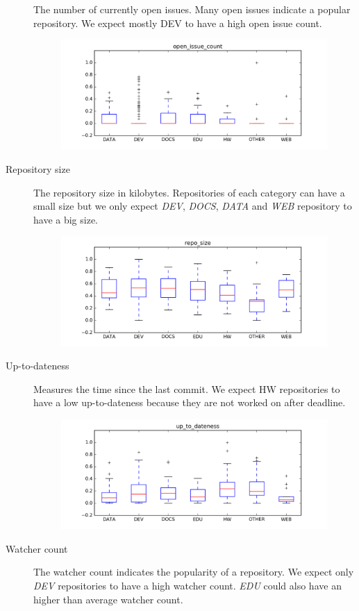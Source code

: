 \documentclass[a4paper]{scrartcl}
\begin{document}
\begin{description}
				The number of currently open issues. Many open issues indicate a popular repository. We expect mostly DEV to have a high open issue count.
				\begin{figure}[h!]
					\centering
					\includegraphics[width=0.75\linewidth]{figures/open_issue_count.png}
				\end{figure}
			\item[Repository size]
				The repository size in kilobytes. Repositories of each category can have a small size but we only expect \emph{DEV}, \emph{DOCS}, \emph{DATA} and \emph{WEB} repository to have a big size.
				\begin{figure}[h!]
					\centering
					\includegraphics[width=0.75\linewidth]{figures/repo_size.png}
				\end{figure}
			\item[Up-to-dateness]
				Measures the time since the last commit. We expect HW repositories to have a low up-to-dateness because they are not worked on after deadline.
				\begin{figure}[h!]
					\centering
					\includegraphics[width=0.75\linewidth]{figures/up_to_dateness.png}
				\end{figure}
			\item[Watcher count]
				The watcher count indicates the popularity of a repository. We expect only \emph{DEV} repositories to have a high watcher count. \emph{EDU} could also have an higher than average watcher count.

\end{description}
\end{document}
